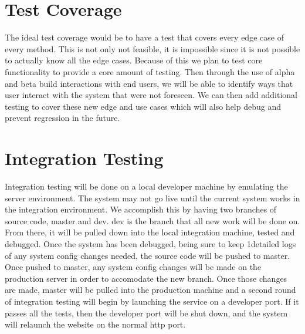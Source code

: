 \section{Test Coverage}

The ideal test coverage would be to have a test that covers every edge case of
every method.  This is not only not feasible, it is impossible since it is not
possible to actually know all the edge cases.  Because of this we plan to test
core functionality to provide a core amount of testing.  Then through the use
of alpha and beta build interactions with end users, we will be able to identify
ways that user interact with the system that were not foreseen. We can then add
additional testing to cover these new edge and use cases which will also help
debug and prevent regression in the future.\\



\section{Integration Testing}

Integration testing will be done on a local developer machine by emulating the
server environment.  The system may not go live until the current system works
in the integration environment.  We accomplish this by having two branches of
source code, master and dev.  dev is the branch that all new work will be done
on.  From there, it will be pulled down into the local integration machine,
tested and debugged.  Once the system has been debugged, being sure to keep
1detailed logs of any system config changes needed, the source code will be
pushed to master.  Once pushed to master, any system config changes will be made
on the production server in order to accomodate the new branch.  Once those changes
are made, master will be pulled into the production machine and a second round of
integration testing will begin by launching the service on a developer port.
If it passes all the tests, then the developer port will be shut down, and the
system will relaunch the website on the normal http port.\\
